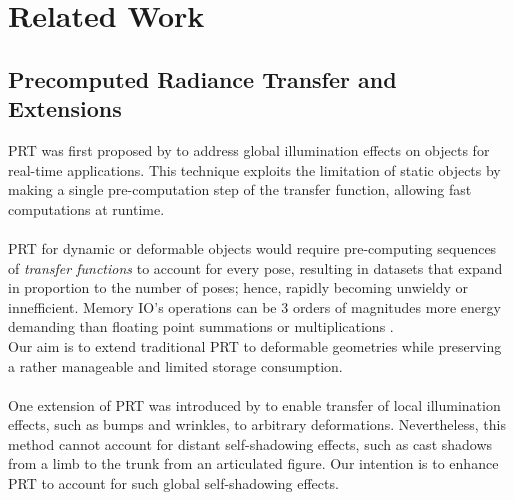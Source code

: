 \section{Related Work}
\subsection*{Precomputed Radiance Transfer and Extensions} 
PRT was first proposed by \cite{sloan2002precomputed} to address global illumination effects on objects for real-time applications. This technique exploits the limitation of static objects by making a single pre-computation step of the transfer function, allowing fast computations at runtime. \\
\\
PRT for dynamic or deformable objects would require pre-computing sequences of \textit{transfer functions} to account for every pose, resulting in datasets that expand in proportion to the number of poses; hence, rapidly becoming unwieldy or innefficient. Memory IO's operations can be 3 orders of magnitudes more energy demanding than floating point summations or multiplications \cite{ComputingEnergy}.\\
Our aim is to extend traditional PRT to deformable geometries while preserving a rather manageable and limited storage consumption.
\\
\\
One extension of PRT was introduced by  \cite{local-deformable-precomputed-radiance-transfer} to enable transfer of local illumination effects, such as bumps and wrinkles, to arbitrary deformations.  Nevertheless, this method cannot account for distant self-shadowing effects, such as cast shadows from a limb to the trunk from an articulated figure. Our intention is to enhance PRT to account for such global self-shadowing effects.\\
